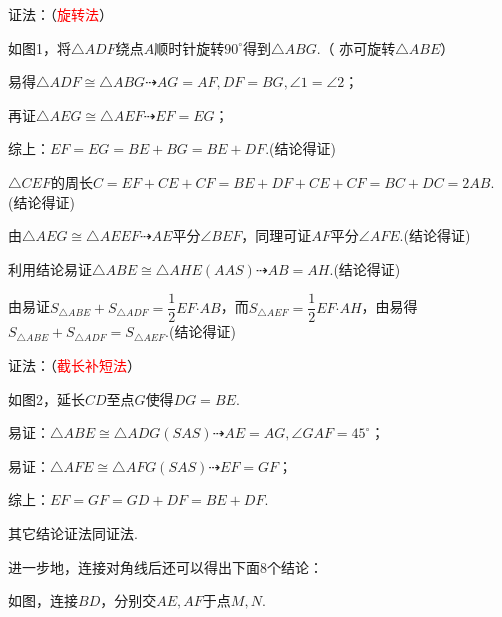 \documentclass[10pt]{ctexart}
\begin{document}
{\kaishu\color{blue}
证法：（\textcolor{red}{旋转法}）

如图1，将$\triangle ADF$绕点$A$顺时针旋转$90^\circ$得到$\triangle ABG$.（ 亦可旋转$\triangle ABE$）

易得$\triangle ADF\cong \triangle ABG \dashrightarrow AG=AF,DF=BG,\angle 1=\angle 2$；

再证$\triangle AEG\cong \triangle AEF\dashrightarrow EF=EG$；

综上：$EF=EG=BE+BG=BE+DF$.(结论得证)

$\triangle CEF$的周长$C=EF+CE+CF=BE+DF+CE+CF=BC+DC=2AB$.(结论得证)

由$\triangle AEG\cong \triangle AEEF\dashrightarrow AE$平分$\angle BEF$，同理可证$AF$平分$\angle AFE$.(结论得证)

利用结论易证$\triangle ABE\cong \triangle AHE(AAS)\dashrightarrow AB=AH$.(结论得证)

由易证$S_{\triangle ABE}+S_{\triangle ADF}=\dfrac{1}{2}EF\bm\cdot AB$，而$S_{\triangle AEF}=\dfrac{1}{2}EF\bm\cdot AH$，由易得$S_{\triangle ABE}+S_{\triangle ADF}=S_{\triangle AEF}$.(结论得证)


证法：（\textcolor{red}{截长补短法}）

如图2，延长$CD$至点$G$使得$DG=BE$.

易证：$\triangle ABE\cong \triangle ADG(SAS)\dashrightarrow AE=AG,\angle GAF=45^\circ$；

易证：$\triangle AFE\cong \triangle AFG(SAS)\dashrightarrow EF=GF$；

综上：$EF=GF=GD+DF=BE+DF$.

其它结论证法同证法.}

进一步地，连接对角线后还可以得出下面8个结论：

如图，连接$BD$，分别交$AE,AF$于点$M,N$.
\end{document}
